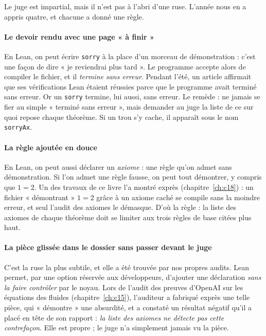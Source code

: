 Le juge est impartial, mais il n'est pas à l'abri d'une ruse. L'année nous en a appris quatre, et chacune a donné une
règle.

\paragraph{Le devoir rendu avec une page « à finir »} En Lean, on peut écrire \texttt{sorry} à la place d'un morceau de
démonstration : c'est une façon de dire « je reviendrai plus tard ». Le programme accepte alors de compiler le fichier,
et il \emph{termine sans erreur}. Pendant l'été, un article affirmait que ses vérifications Lean étaient réussies
parce que le programme avait terminé sans erreur. Or un \texttt{sorry} termine, lui aussi, sans erreur. Le remède : ne
jamais se fier au simple « terminé sans erreur », mais demander au juge la liste de ce sur quoi repose chaque
théorème. Si un trou s'y cache, il apparaît sous le nom \texttt{sorryAx}.

\paragraph{La règle ajoutée en douce} En Lean, on peut aussi déclarer un \emph{axiome} : une règle qu'on admet sans
démonstration. Si l'on admet une règle fausse, on peut tout démontrer, y compris que $1=2$. Un des travaux de ce
livre l'a montré exprès (chapitre~\ref{ch:c18}) : un fichier « démontrant » $1=2$ grâce à un axiome caché se compile
sans la moindre erreur, et seul l'audit des axiomes le démasque. D'où la règle : la liste des axiomes de chaque
théorème doit se limiter aux trois règles de base citées plus haut.

\paragraph{La pièce glissée dans le dossier sans passer devant le juge} C'est la ruse la plus subtile, et elle a été
trouvée par nos propres audits. Lean permet, par une option réservée aux développeurs, d'ajouter une déclaration
\emph{sans la faire contrôler} par le noyau. Lors de l'audit des preuves d'OpenAI sur les équations des fluides
(chapitre~\ref{ch:c15}), l'auditeur a fabriqué exprès une telle pièce, qui « démontre » une absurdité, et a constaté
un résultat négatif qu'il a placé en tête de son rapport : \emph{la liste des axiomes ne détecte pas cette
contrefaçon}. Elle est propre ;
le juge n'a simplement jamais vu la pièce.

